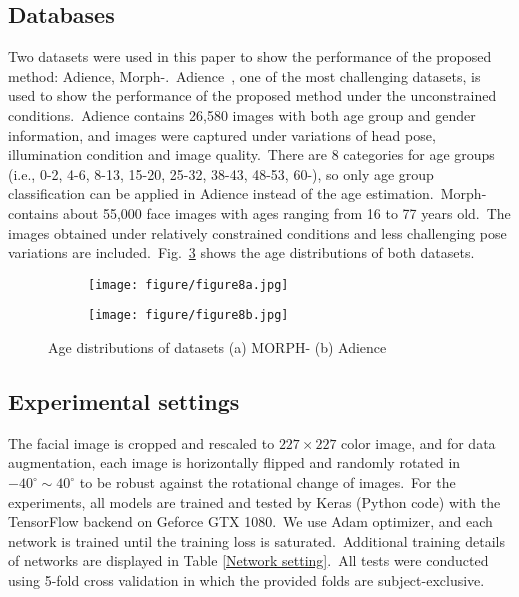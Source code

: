 \documentclass[10pt,twocolumn,letterpaper]{article}
\begin{document}
\subsection{Databases}
\label{Databases}
Two datasets were used in this paper to show the performance of the proposed method: Adience, Morph-.~Adience~\cite{Eidinger2014}, one of the most challenging datasets, is used to show the performance of the proposed method under the unconstrained conditions.~Adience contains 26,580 images with both age group and gender information, and images were captured under variations of head pose, illumination condition and image quality.~There are 8 categories for age groups (i.e., 0-2, 4-6, 8-13, 15-20, 25-32, 38-43, 48-53, 60-), so only age group classification can be applied in Adience instead of the age estimation.~Morph- \cite{morph} contains about 55,000 face images with ages ranging from 16 to 77 years old.~The images obtained under relatively constrained conditions and less challenging pose variations are included.~Fig.~\ref{fig:figure_8} shows the age distributions of both datasets.

\begin{figure}[!h]
\centering
\begin{subfigure}[t]{\linewidth}
    \centering
    \texttt{[image: figure/figure8a.jpg]}
    \caption{}
    \label{fig:figure_8a}
\end{subfigure}
\quad
\begin{subfigure}[t]{\linewidth}
    \centering
    \texttt{[image: figure/figure8b.jpg]}
    \caption{}
    \label{fig:figure_8b}
\end{subfigure}
\caption{Age distributions of datasets (a) MORPH- (b) Adience}
\label{fig:figure_8}
\end{figure}

\subsection{Experimental settings}
The facial image is cropped and rescaled to $227\times227$ color image, and for data augmentation, each image is horizontally flipped and randomly rotated in $-40^{\circ}\sim40^{\circ}$ to be robust against the rotational change of images.~For the experiments, all models are trained and tested by Keras (Python code) \cite{chollet2015keras} with the TensorFlow backend on Geforce GTX 1080.~We use Adam optimizer, and each network is trained until the training loss is saturated.~Additional training details of networks are displayed in Table \ref{Network setting}.~All tests were conducted using 5-fold cross validation in which the provided folds are subject-exclusive.
\end{document}
